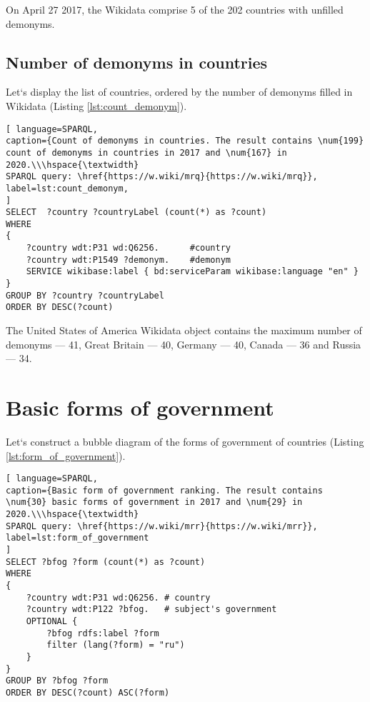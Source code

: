 
On April 27 2017, the Wikidata comprise 5 of the 202 countries with unfilled demonyms.

\subsection{Number of demonyms in countries}

Let`s display the list of countries, ordered by the number of demonyms filled in Wikidata (Listing \ref{lst:count_demonym}).

\begin{lstlisting}[ language=SPARQL, 
caption={Count of demonyms in countries. The result contains \num{199} count of demonyms in countries in 2017 and \num{167} in 2020.\\\hspace{\textwidth}
SPARQL query: \href{https://w.wiki/mrq}{https://w.wiki/mrq}},
label=lst:count_demonym, 
]
SELECT  ?country ?countryLabel (count(*) as ?count)
WHERE
{
	?country wdt:P31 wd:Q6256.      #country
	?country wdt:P1549 ?demonym.    #demonym
	SERVICE wikibase:label { bd:serviceParam wikibase:language "en" }
}
GROUP BY ?country ?countryLabel 
ORDER BY DESC(?count)
\end{lstlisting}

The United States of America Wikidata object contains the maximum number of demonyms --- 41, Great Britain --- 40, Germany --- 40, Canada --- 36 and Russia --- 34.

\section{Basic forms of government}

Let`s construct a bubble diagram of the forms of government of countries (Listing \ref{lst:form_of_government}).

\begin{lstlisting}[ language=SPARQL, 
caption={Basic form of government ranking. The result contains \num{30} basic forms of government in 2017 and \num{29} in 2020.\\\hspace{\textwidth}
SPARQL query: \href{https://w.wiki/mrr}{https://w.wiki/mrr}},
label=lst:form_of_government
]
SELECT ?bfog ?form (count(*) as ?count)
WHERE 
{
	?country wdt:P31 wd:Q6256. # country
	?country wdt:P122 ?bfog.   # subject's government
	OPTIONAL {
		?bfog rdfs:label ?form
		filter (lang(?form) = "ru")
	}
}
GROUP BY ?bfog ?form
ORDER BY DESC(?count) ASC(?form)
\end{lstlisting}

